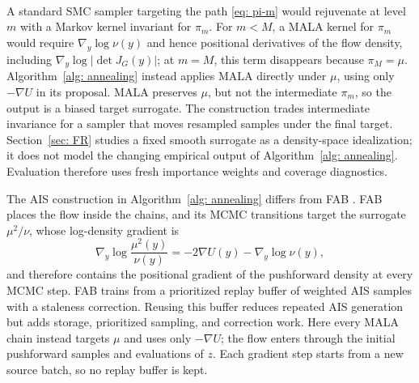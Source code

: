 \documentclass{article}
\begin{document}
\begin{algorithm}[htb]
\caption{Annealed importance sampling (AIS) for a biased target surrogate}
\label{alg: annealing}

\end{algorithm}
\mbox{} \\
A standard SMC sampler targeting the path \eqref{eq: pi-m} would rejuvenate at level $m$ with a Markov kernel invariant for $\pi_m$. For $m<M$, a MALA kernel for $\pi_m$ would require $\nabla_y\log\nu(y)$ and hence positional derivatives of the flow density, including $\nabla_y\log|\det J_G(y)|$; at $m=M$, this term disappears because $\pi_M=\mu$. Algorithm~\ref{alg: annealing} instead applies MALA directly under $\mu$, using only $-\nabla U$ in its proposal. MALA preserves $\mu$, but not the intermediate $\pi_m$, so the output is a biased target surrogate. The construction trades intermediate invariance for a sampler that moves resampled samples under the final target. Section~\ref{sec: FR} studies a fixed smooth surrogate as a density-space idealization; it does not model the changing empirical output of Algorithm~\ref{alg: annealing}. Evaluation therefore uses fresh importance weights and coverage diagnostics.

The AIS construction in Algorithm~\ref{alg: annealing} differs from FAB \citep{midgley2022flow}. FAB places the flow inside the chains, and its MCMC transitions target the surrogate $\mu^2/\nu$, whose log-density gradient is
\begin{equation*}
    \nabla_y \log \frac{\mu^2(y)}{\nu(y)} = -2\nabla U(y) - \nabla_y \log\nu(y),
\end{equation*}
and therefore contains the positional gradient of the pushforward density at every MCMC step. FAB trains from a prioritized replay buffer of weighted AIS samples with a staleness correction. Reusing this buffer reduces repeated AIS generation but adds storage, prioritized sampling, and correction work. Here every MALA chain instead targets $\mu$ and uses only $-\nabla U$; the flow enters through the initial pushforward samples and evaluations of $z$. Each gradient step starts from a new source batch, so no replay buffer is kept.
\end{document}
